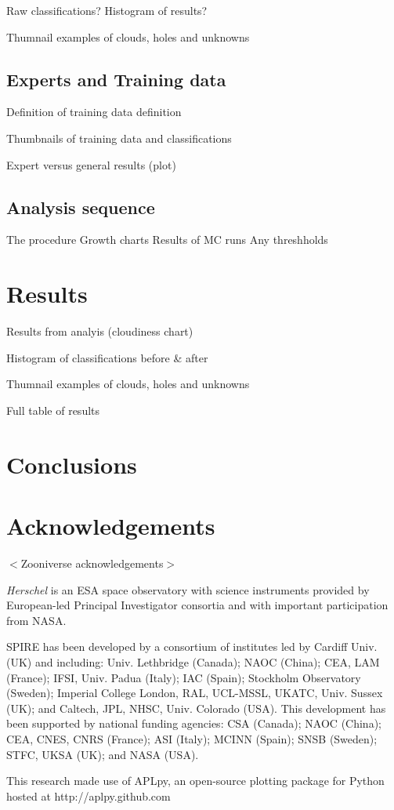 \documentclass[a4,useAMS,usenatbib]{mn2e}
\newcommand*{\chck}[1]{{\color{red}$<$#1$>$}}
\begin{document}
Raw classifications?
Histogram of results?

Thumnail examples of clouds, holes and unknowns

\subsection{Experts and Training data}
Definition of training data definition

Thumbnails of training data and classifications

Expert versus general results (plot)

\subsection{Analysis sequence}
The procedure
Growth charts
Results of MC runs
Any threshholds


\section{Results}
Results from analyis (cloudiness chart)

Histogram of classifications before \& after

Thumnail examples of clouds, holes and unknowns

Full table of results

\section{Conclusions}


\section{Acknowledgements}
\chck{Zooniverse acknowledgements}

{\em Herschel} is an ESA space observatory with science instruments
provided by European-led Principal Investigator consortia and with important
participation from NASA.

SPIRE has been developed by a consortium of institutes led by Cardiff
Univ. (UK) and including: Univ. Lethbridge (Canada); NAOC (China);
CEA, LAM (France); IFSI, Univ. Padua (Italy); IAC (Spain); Stockholm
Observatory (Sweden); Imperial College London, RAL, UCL-MSSL, UKATC,
Univ. Sussex (UK); and Caltech, JPL, NHSC, Univ. Colorado (USA). This
development has been supported by national funding agencies: CSA
(Canada); NAOC (China); CEA, CNES, CNRS (France); ASI (Italy); MCINN
(Spain); SNSB (Sweden); STFC, UKSA (UK); and NASA (USA).

This research made use of APLpy, an open-source plotting package for
Python hosted at http://aplpy.github.com
\end{document}
